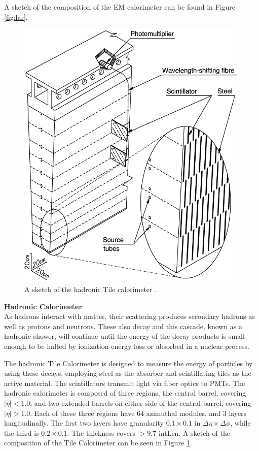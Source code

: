 A sketch of the composition of the \gls{EM} calorimeter can be found in Figure \ref{fig:lar}.

\begin{figure}[!ht]
    \centering
    \includegraphics[width=.65\textwidth]{chapters/chapter2_experiment/images/tile.png}
    \caption[A sketch of the hadronic Tile calorimeter]{A sketch of the hadronic Tile calorimeter \cite{tile-tdr}.}
    \label{fig:tile}
\end{figure}


\noindent\textbf{Hadronic Calorimeter}\\
\indent As hadrons interact with matter, their scattering produces secondary hadrons as well as protons and neutrons. These also decay and this cascade, known as a hadronic shower, will continue until the energy of the decay products is small enough to be halted by ionization energy loss or absorbed in a nuclear process.

\indent The hadronic Tile Calorimeter is designed to measure the energy of particles by using these decays, employing steel as the absorber and scintillating tiles as the active material. The scintillators transmit light via fiber optics to \glspl{PMT}. The hadronic calorimeter is composed of three regions, the central barrel, covering $|\eta| < 1.0$, and two extended barrels on either side of the central barrel, covering $|\eta| > 1.0$. Each of these three regions have 64 azimuthal modules, and 3 layers longitudinally. The first two layers have granularity $0.1 \times 0.1$ in $\Delta\eta \times \Delta \phi$, while the third is $0.2 \times 0.1$. The thickness covers $>9.7$ \gls{intLen}. A sketch of the composition of the Tile Calorimeter can be seen in Figure \ref{fig:tile}.


